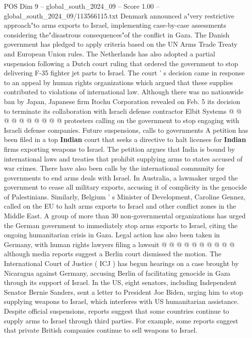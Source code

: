 \begin{textsample}{POS Dim 9 – global\_south\_2024\_09 – Score 1.00 – global\_south\_2024\_09/113566115.txt}
Denmark announced a"very restrictive approach"to arms exports to Israel, implementing case-by-case assessments considering the"disastrous consequences"of the conflict in Gaza.
The Danish government has pledged to apply criteria based on the UN Arms Trade Treaty and European Union rules.
The Netherlands has also adopted a partial suspension following a Dutch court ruling that ordered the government to stop delivering F-35 fighter jet parts to Israel.
The court ' s decision came in response to an appeal by human rights organizations which argued that these supplies contributed to violations of international law.
Although there was no nationwide ban by Japan, Japanese firm Itochu Corporation revealed on Feb. 5 its decision to terminate its collaboration with Israeli defense contractor Elbit Systems @ @ @ @ @ @ @ @ @ @ protesters calling on the government to stop engaging with Israeli defense companies.
Future suspensions, calls to governments A petition has been filed in a top \textbf{Indian} court that seeks a directive to halt licenses for \textbf{Indian} firms exporting weapons to Israel.
The petition argues that India is bound by international laws and treaties that prohibit supplying arms to states accused of war crimes.
There have also been calls by the international community for governments to end arms deals with Israel.
In Australia, a lawmaker urged the government to cease all military exports, accusing it of complicity in the genocide of Palestinians.
Similarly, Belgium ' s Minister of Development, Caroline Gennez, called on the EU to halt arms exports to Israel and other conflict zones in the Middle East.
A group of more than 30 non-governmental organizations has urged the German government to immediately stop arms exports to Israel, citing the ongoing humanitarian crisis in Gaza.
Legal action has also been taken in Germany, with human rights lawyers filing a lawsuit @ @ @ @ @ @ @ @ @ @ although media reports suggest a Berlin court dismissed the motion.
The International Court of Justice ( ICJ ) has begun hearings on a case brought by Nicaragua against Germany, accusing Berlin of facilitating genocide in Gaza through its support of Israel.
In the US, eight senators, including Independent Senator Bernie Sanders, sent a letter to President Joe Biden, urging him to stop supplying weapons to Israel, which interferes with US humanitarian assistance.
Despite official suspensions, reports suggest that some countries continue to supply arms to Israel through third parties.
For example, some reports suggest that private British companies continue to sell weapons to Israel.

\end{textsample}
